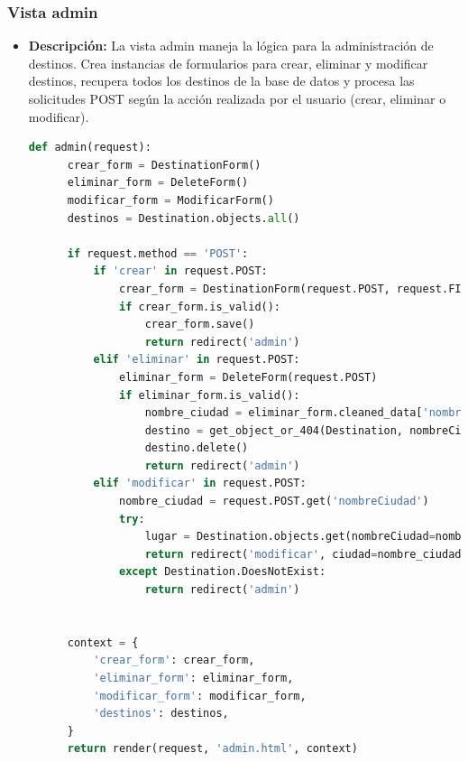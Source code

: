 \documentclass{article}
\begin{document}
  \subsubsection{Vista admin}
  \begin{itemize}
    \item \textbf{Descripción: }La vista admin maneja la lógica para la administración de destinos. Crea instancias 
    de formularios para crear, eliminar y modificar destinos, recupera todos los destinos de la base de datos y procesa 
    las solicitudes POST según la acción realizada por el usuario (crear, eliminar o modificar).
    \begin{lstlisting}[language=Python, caption={admin}]
    def admin(request):
      crear_form = DestinationForm()
      eliminar_form = DeleteForm()
      modificar_form = ModificarForm()
      destinos = Destination.objects.all()
      
      if request.method == 'POST':
          if 'crear' in request.POST:
              crear_form = DestinationForm(request.POST, request.FILES)
              if crear_form.is_valid():
                  crear_form.save()
                  return redirect('admin')
          elif 'eliminar' in request.POST:
              eliminar_form = DeleteForm(request.POST)
              if eliminar_form.is_valid():
                  nombre_ciudad = eliminar_form.cleaned_data['nombreCiudad']
                  destino = get_object_or_404(Destination, nombreCiudad=nombre_ciudad)
                  destino.delete()
                  return redirect('admin')
          elif 'modificar' in request.POST:
              nombre_ciudad = request.POST.get('nombreCiudad')
              try:
                  lugar = Destination.objects.get(nombreCiudad=nombre_ciudad)
                  return redirect('modificar', ciudad=nombre_ciudad)
              except Destination.DoesNotExist:
                  return redirect('admin')
              
      
      context = {
          'crear_form': crear_form,
          'eliminar_form': eliminar_form,
          'modificar_form': modificar_form,
          'destinos': destinos,
      }
      return render(request, 'admin.html', context)
    \end{lstlisting}
  \end{itemize}
  
\end{document}
